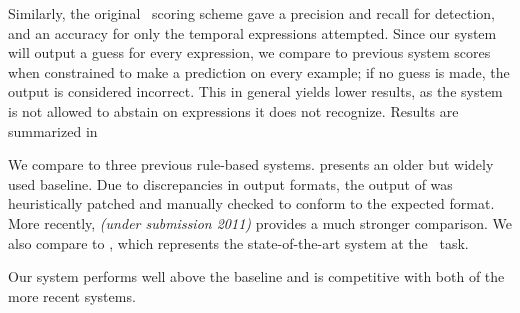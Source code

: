 Similarly, the original \tempeval\ scoring scheme gave a precision 
	and recall for detection, and an accuracy for only the temporal expressions 
	attempted.
Since our system will output a guess for every expression, we compare to 
	previous system scores when constrained to make a prediction on every
	example; if no guess is made, the output is considered incorrect.
This in general yields lower results, as the system is not allowed to
	abstain on expressions it does not recognize.
Results are summarized in 

We compare to three previous rule-based systems.
 \cite{key:2000mani-temporal} presents an older but widely
	used baseline.
Due to discrepancies in output formats, 
	the output of  was heuristically patched
	and manually checked to conform to the expected format.
More recently,  \textit{(under submission 2011)} 
	provides a much stronger comparison.
We also compare to  \cite{key:2010strotgen-temporal}, 
	which represents the state-of-the-art system at the \tempeval\ task.

Our system performs well above the  baseline and is competitive
	with both of the more recent systems.



